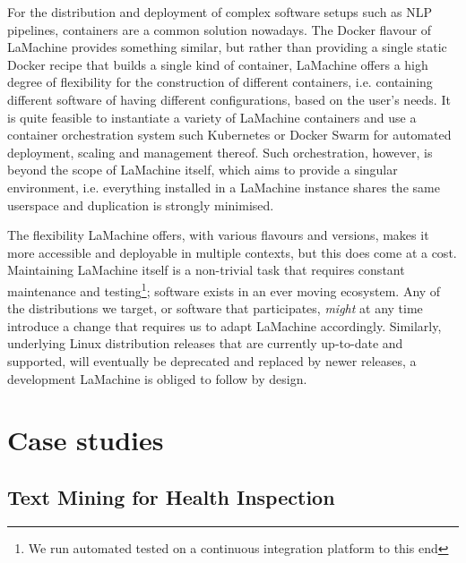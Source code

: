 \documentclass[a4paper,11pt]{article}
\begin{document}
For the distribution and deployment of complex software setups such as NLP pipelines, containers are a common solution
nowadays. The Docker flavour of LaMachine provides something similar, but rather than providing a single static Docker recipe
that builds a single kind of container, LaMachine offers a high degree of flexibility for the construction of different
containers, i.e. containing different software of having different configurations, based on the user's needs. It is
quite feasible to instantiate a variety of LaMachine containers and use a container orchestration system such
Kubernetes or Docker Swarm for automated deployment, scaling and management thereof. Such orchestration, however, is
beyond the scope of LaMachine itself, which aims to provide a singular environment, i.e. everything installed in a
LaMachine instance shares the same userspace and duplication is strongly minimised.

The flexibility LaMachine offers, with various flavours and versions, makes it more accessible and deployable in
multiple contexts, but this does come at a cost. Maintaining LaMachine itself is a non-trivial task that requires
constant maintenance and testing\footnote{We run automated tested on a continuous integration platform to this end};
software exists in an ever moving ecosystem. Any of the distributions we target, or software that participates, \emph{might}
at any time introduce a change that requires us to adapt LaMachine accordingly. Similarly, underlying Linux
distribution releases that are currently up-to-date and supported, will eventually be deprecated and replaced by newer releases, a development
LaMachine is obliged to follow by design.

\section{Case studies}\label{sec:case}

\subsection{Text Mining for Health Inspection}
\end{document}
